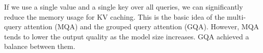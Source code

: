 If we use a single value and a single key over all queries, we can significantly reduce the memory usage for KV caching. This is the basic idea of the multi-query attention (MQA) and the grouped query attention (GQA). However, MQA tends to lower the output quality as the model size increases. GQA achieved a balance between them. 


